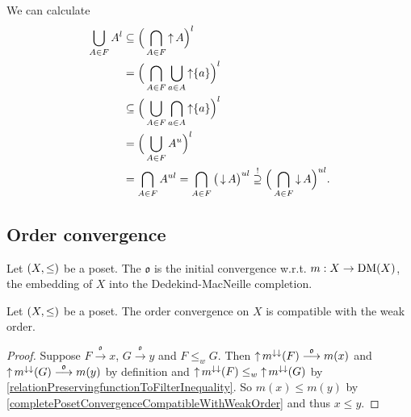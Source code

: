 We can calculate
\begin{align*}
\bigcup_{A\in F}A^l &\subseteq \Big(\bigcap_{A\in F} \operatorname{\uparrow} A\Big)^l \\
&= \Big(\bigcap_{A\in F} \bigcup_{a\in A} \operatorname{\uparrow} \{a\}\Big)^l \\
&\subseteq \Big(\bigcup_{A\in F} \bigcap_{a\in A} \operatorname{\uparrow} \{a\}\Big)^l \\
&= \Big(\bigcup_{A\in F} A^u\Big)^l \\
&= \bigcap_{A\in F}A^{ul} = \bigcap_{A\in F}\big(\operatorname{\downarrow} A\big)^{ul} \overset{!}{\supseteq} \Big(\bigcap_{A\in F}\operatorname{\downarrow} A\Big)^{ul}.
\end{align*}

\subsection{Order convergence}
\begin{definition}
Let $\sSet{X,\leq}$ be a poset. The  $\mathfrak{o}$ is the initial convergence w.r.t. $m: X \to \operatorname{DM}(X)$, the embedding of $X$ into the Dedekind-MacNeille completion.
\end{definition}

\begin{lemma}
Let $\sSet{X,\leq}$ be a poset. The order convergence on $X$ is compatible with the weak order.
\end{lemma}
\begin{proof}
Suppose $F\overset{\mathfrak{o}}{\longrightarrow} x$, $G\overset{\mathfrak{o}}{\longrightarrow} y$ and $F\leq_w G$. Then $\operatorname{\uparrow} m^{\downarrow\downarrow}(F) \overset{\mathfrak{o}}{\longrightarrow} m(x)$ and $\operatorname{\uparrow} m^{\downarrow\downarrow}(G) \overset{\mathfrak{o}}{\longrightarrow} m(y)$ by definition and $\operatorname{\uparrow} m^{\downarrow\downarrow}(F) \leq_w \operatorname{\uparrow} m^{\downarrow\downarrow}(G)$ by \ref{relationPreservingfunctionToFilterInequality}. So $m(x)\leq m(y)$ by \ref{completePosetConvergenceCompatibleWithWeakOrder} and thus $x\leq y$. 
\end{proof}

